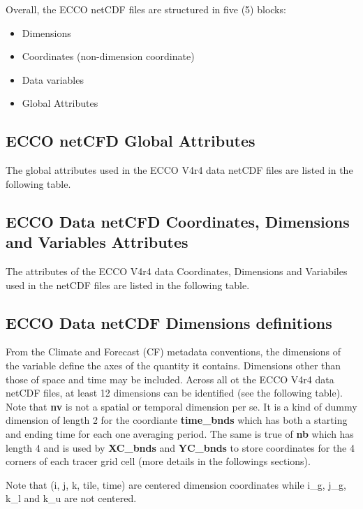 \par \vspace{0.1in} Overall, the ECCO netCDF  files are structured in five (5) blocks: 
\begin{itemize}
    \item Dimensions
    \item Coordinates (non-dimension coordinate)
    \item Data variables
    \item Global Attributes
\end{itemize}

\subsection{ECCO netCFD Global Attributes}
\par The global attributes used in the ECCO V4r4 data netCDF files are listed in the following table.
 

\subsection{ECCO Data netCFD Coordinates, Dimensions and Variables Attributes}
\par The attributes of the ECCO V4r4 data Coordinates, Dimensions and Variabiles used in the netCDF files are listed in the following table.
 

\subsection{ECCO Data netCDF Dimensions definitions}
From the Climate and Forecast (CF) metadata conventions, the dimensions of the variable define the axes of the quantity it contains. Dimensions other than those of space and time may be included. Across all ot the ECCO V4r4 data netCDF files, at least 12 dimensions can be identified (see the following table). Note that \textbf{nv} is not a spatial or temporal dimension per se. It is a kind of dummy dimension of length 2 for the coordiante \textbf{time\_bnds} which has both a starting and ending time for each one averaging period. The same is true of \textbf{nb} which has length 4 and is used by \textbf{XC\_bnds} and \textbf{YC\_bnds} to store coordinates for the 4 corners of each tracer grid cell (more details in the followings sections).


\par Note that (i, j, k, tile, time) are centered dimension coordinates while i\_g, j\_g, k\_l and k\_u are not centered.
